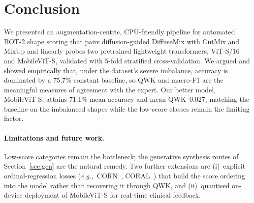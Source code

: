 \documentclass[10pt,twocolumn,letterpaper]{article}
\newcommand{\eg}{\textit{e.g.,}}
\newcommand{\BaselineMeanAcc}{75.7}
\newcommand{\BestModel}{MobileViT-S}
\newcommand{\BestMeanAcc}{71.1}
\newcommand{\BestMeanQWK}{0.027}
\begin{document}
\section{Conclusion}
\label{sec:conclusion}

We presented an augmentation-centric, CPU-friendly pipeline for automated BOT-2
shape scoring that pairs diffusion-guided DiffuseMix with CutMix and MixUp and
linearly probes two pretrained lightweight transformers, ViT-S/16 and
MobileViT-S, validated with 5-fold stratified cross-validation. We argued and
showed empirically that, under the dataset's severe imbalance, accuracy is
dominated by a \BaselineMeanAcc\% constant baseline, so QWK and macro-F1 are
the meaningful measures of agreement with the expert. Our better model,
\BestModel, attains \BestMeanAcc\% mean accuracy and mean QWK~\BestMeanQWK,
matching the baseline on the imbalanced shapes while the low-score classes
remain the limiting factor.

\paragraph{Limitations and future work.}
Low-score categories remain the bottleneck; the generative synthesis routes of
Section~\ref{sec:gen} are the natural remedy. Two further extensions are
(i)~explicit ordinal-regression losses (\eg\ CORN~\cite{corn},
CORAL~\cite{coral}) that build the score ordering into the model rather than
recovering it through QWK, and (ii)~quantised on-device deployment of
MobileViT-S for real-time clinical feedback.

{\small


}
\end{document}
